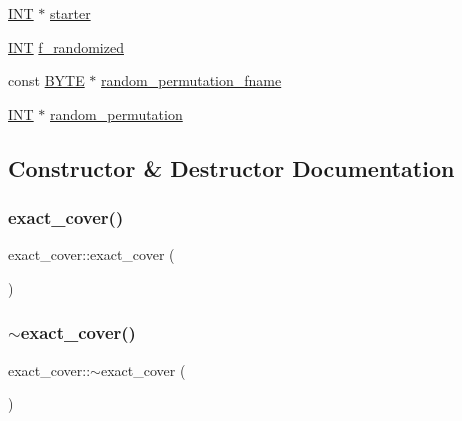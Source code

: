 \begin{DoxyCompactItemize}
\item 
\mbox{\hyperlink{galois_8h_a09fddde158a3a20bd2dcadb609de11dc}{I\+NT}} $\ast$ \mbox{\hyperlink{classexact__cover_a6cb02093fe992cbcb4cc84bb7396c103}{starter}}
\item 
\mbox{\hyperlink{galois_8h_a09fddde158a3a20bd2dcadb609de11dc}{I\+NT}} \mbox{\hyperlink{classexact__cover_a934ebb987e78305edd56517014977d88}{f\+\_\+randomized}}
\item 
const \mbox{\hyperlink{galois_8h_ab6cc7b4aeb6ea31aba2b3fbfc83ff5e6}{B\+Y\+TE}} $\ast$ \mbox{\hyperlink{classexact__cover_a0e8e0feeef57ad4cb93fe36eca1a57d0}{random\+\_\+permutation\+\_\+fname}}
\item 
\mbox{\hyperlink{galois_8h_a09fddde158a3a20bd2dcadb609de11dc}{I\+NT}} $\ast$ \mbox{\hyperlink{classexact__cover_a592c719ffddf733f4d2315790fca7d11}{random\+\_\+permutation}}
\end{DoxyCompactItemize}


\subsection{Constructor \& Destructor Documentation}
\mbox{\label{classexact__cover_a86e6e945c496226c943d004e21c34545}} 
\subsubsection{\texorpdfstring{exact\+\_\+cover()}{exact\_cover()}}
{\footnotesize\ttfamily exact\+\_\+cover\+::exact\+\_\+cover (\begin{DoxyParamCaption}{ }\end{DoxyParamCaption})}

\mbox{\label{classexact__cover_a11e2485369f3c825c879c7d31770bb49}} 
\subsubsection{\texorpdfstring{$\sim$exact\+\_\+cover()}{~exact\_cover()}}
{\footnotesize\ttfamily exact\+\_\+cover\+::$\sim$exact\+\_\+cover (\begin{DoxyParamCaption}{ }\end{DoxyParamCaption})}



